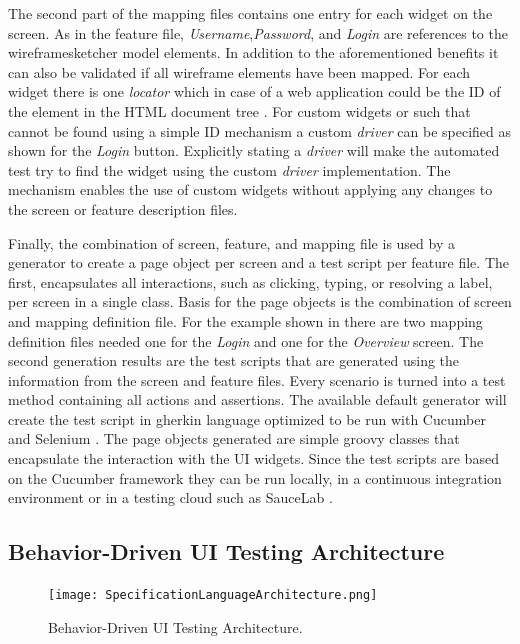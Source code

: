\documentclass{sig-alternate-05-2015}
\begin{document}
The second part of the mapping files contains one entry for each widget on the screen.
As in the feature file, \textit{Username},\textit{Password}, and \textit{Login} are references to the wireframesketcher model elements.
In addition to the aforementioned benefits it can also be validated if all wireframe elements have been mapped.
For each widget there is one \textit{locator} which in case of a web application could be the ID of the element in the HTML document tree \cite{w3c.dom}.
For custom widgets or such that cannot be found using a simple ID mechanism a custom \textit{driver} can be specified as shown for the \textit{Login} button.
Explicitly stating a \textit{driver} will make the automated test try to find the widget using the custom \textit{driver} implementation. 
The mechanism enables the use of custom widgets without applying any changes to the screen or feature description files.

Finally, the combination of screen, feature, and mapping file is used by a generator to create a page object per screen and a test script per feature file.
The first, encapsulates all interactions, such as clicking, typing, or resolving a label, per screen in a single class.
Basis for the page objects is the combination of screen and mapping definition file.
For the example shown in  there are two mapping definition files needed one for the \textit{Login} and one for the \textit{Overview} screen.
The second generation results are the test scripts that are generated using the information from the screen and feature files.
Every scenario is turned into a test method containing all actions and assertions.
The available default generator will create the test script in gherkin language optimized to be run with Cucumber and Selenium \cite{wynne2012cucumber}.
The page objects generated are simple groovy classes that encapsulate the interaction with the UI widgets.
Since the test scripts are based on the Cucumber framework they can be run locally, in a continuous integration environment or in a testing cloud such as SauceLab \cite{saucelab}.

\subsection{Behavior-Driven UI Testing Architecture}
\begin{figure}[h]
	\centering
	\texttt{[image: SpecificationLanguageArchitecture.png]}
	\caption{Behavior-Driven UI Testing Architecture.}
	\label{fig:architectureOverview}
\end{figure}
\end{document}
